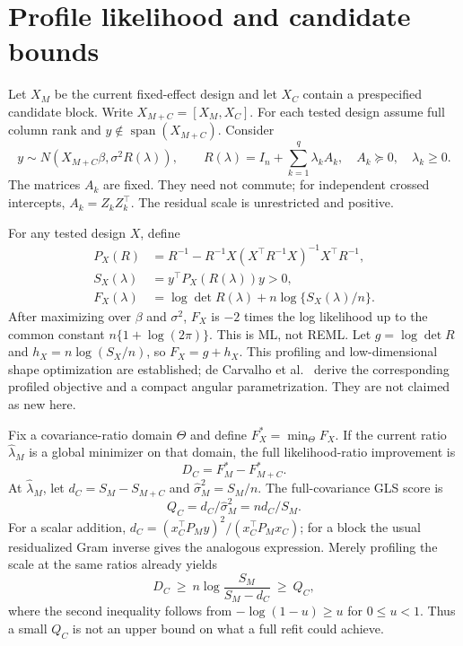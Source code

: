 \documentclass[preprint,11pt,numbers]{elsarticle}
\theoremstyle{remark}\newtheorem{remark}[theorem]{Remark}
\newcommand{\Span}{\operatorname{span}}
\begin{document}
\section{Profile likelihood and candidate bounds}
Let $X_M$ be the current fixed-effect design and let $X_C$ contain a prespecified
candidate block. Write $X_{M+C}=[X_M,X_C]$. For each tested design assume full column
rank and $y\notin\Span(X_{M+C})$. Consider
\begin{equation}\label{eq:model}
y\sim N(X_{M+C}\beta,\sigma^2R(\lambda)),\qquad
R(\lambda)=I_n+\sum_{k=1}^q\lambda_kA_k,
\quad A_k\succeq0,\quad \lambda_k\geq0.
\end{equation}
The matrices $A_k$ are fixed. They need not commute; for independent crossed
intercepts, $A_k=Z_kZ_k^\top$. The residual scale is unrestricted and positive.

For any tested design $X$, define
\begin{align}
P_X(R)&=R^{-1}-R^{-1}X(X^\top R^{-1}X)^{-1}X^\top R^{-1},\\
S_X(\lambda)&=y^\top P_X(R(\lambda))y>0,\\
F_X(\lambda)&=\log\det R(\lambda)+n\log\{S_X(\lambda)/n\}.
\end{align}
After maximizing over $\beta$ and $\sigma^2$, $F_X$ is $-2$ times the log likelihood
up to the common constant $n\{1+\log(2\pi)\}$. This is ML, not REML.
Let $g=\log\det R$ and $h_X=n\log(S_X/n)$, so $F_X=g+h_X$.
This profiling and low-dimensional shape optimization are established;
de Carvalho et al.~\cite{carvalho} derive the corresponding profiled objective
and a compact angular parametrization. They are not claimed as new here.

Fix a covariance-ratio domain $\Theta$ and define $F_X^*=\min_{\Theta}F_X$. If the
current ratio $\widehat\lambda_M$ is a global minimizer on that domain, the full
likelihood-ratio improvement is
\begin{equation}\label{eq:lr}
D_C=F_M^*-F_{M+C}^*.
\end{equation}
At $\widehat\lambda_M$, let $d_C=S_M-S_{M+C}$ and
$\widehat\sigma_M^2=S_M/n$. The full-covariance GLS score is
\begin{equation}
Q_C=d_C/\widehat\sigma_M^2=nd_C/S_M.
\end{equation}
For a scalar addition, $d_C=(x_C^\top P_My)^2/(x_C^\top P_Mx_C)$; for a block the
usual residualized Gram inverse gives the analogous expression.
Merely profiling the scale at the same ratios already yields
\begin{equation}\label{eq:scale}
D_C\ \geq\ n\log\frac{S_M}{S_M-d_C}\ \geq\ Q_C,
\end{equation}
where the second inequality follows from $-\log(1-u)\geq u$ for $0\leq u<1$.
Thus a small $Q_C$ is not an upper bound on what a full refit could achieve.
\end{document}
